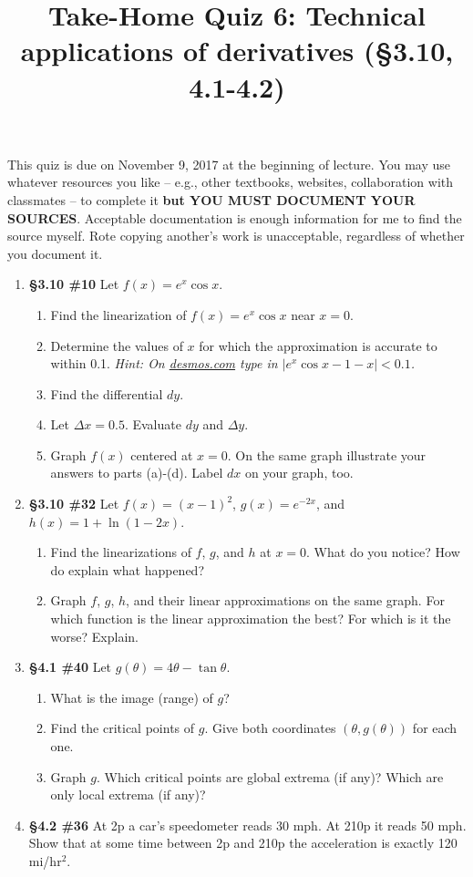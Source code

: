 \documentclass[%
]{article}
\title{\vspace{-3.5pc} 
	\flushleft \bf \Large Take-Home Quiz 6: Technical applications of derivatives %
	 (\S3.10, 4.1-4.2)}
\date{}
\begin{document}
\maketitle

\vspace{-3pc}
 This quiz is due on November 9, 2017 at the beginning of lecture.  You may use whatever resources you like -- e.g., other textbooks, websites, collaboration with classmates -- to complete it \textbf{but YOU MUST DOCUMENT YOUR SOURCES}.  Acceptable documentation is enough information for me to find the source myself.  Rote copying another's work is unacceptable, regardless of whether you document it.  

\noindent\hrulefill

\begin{enumerate}
\item {\bf \S3.10 \#10} Let $f(x)=e^x\cos x$.
	\begin{enumerate}
	\item Find the linearization of $f(x)=e^x\cos x$ near $x=0$.  
	\item Determine the values of $x$ for which the approximation is accurate to within 0.1.  \textit{Hint: On \url{desmos.com} type in $|e^x\cos x-1-x|<0.1$.}
	\item Find the differential $dy$.
	\item Let $\Delta x=0.5$.  Evaluate $dy$ and $\Delta y$.	
	\item Graph $f(x)$ centered at $x=0$.  On the same graph illustrate your answers to parts (a)-(d).  Label $dx$ on your graph, too.	
	\end{enumerate}
	
\item {\bf \S3.10 \#32} Let $f(x)=(x-1)^2$, $g(x)=e^{-2x}$, and $h(x)=1+\ln(1-2x)$.
	\begin{enumerate}
	\item Find the linearizations of $f$, $g$, and $h$ at $x=0$.  What do you notice?  How do explain what happened?
	\item Graph $f$, $g$, $h$, and their linear approximations on the same graph.  For which function is the linear approximation the best?  For which is it the worse?  Explain.
	\end{enumerate}

\item {\bf \S4.1 \#40} Let $g(\theta)=4\theta-\tan{\theta}$.
	\begin{enumerate}
	\item What is the image (range) of $g$?
	\item Find the critical points of $g$.  Give both coordinates $(\theta,g(\theta))$ for each one.
	\item Graph $g$.  Which critical points are global extrema (if any)?  Which are only local extrema (if any)?
	\end{enumerate}

\item {\bf \S4.2 \#36} At 2p a car's speedometer reads 30 mph.  At 210p it reads 50 mph.  Show that at some time between 2p and 210p the acceleration is exactly 120 mi/hr$^2$.	
	
\end{enumerate}
\end{document}

